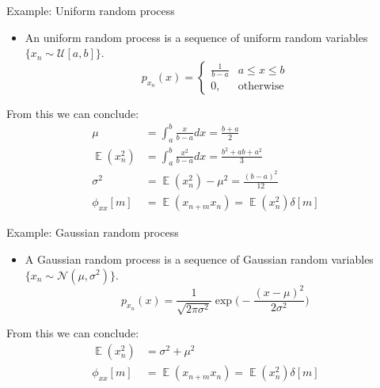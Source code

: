 \documentclass[10pt]{beamer}
\DeclareMathOperator{\E}{\mathbb{E}} %
\begin{document}
\begin{frame}{Example: Uniform random process}
	
	\begin{itemize}
		\item An uniform random process is a sequence of uniform random variables $\{x_n \sim \mathcal{U}[a, b]\}$.
		\begin{equation*}
		p_{x_n}(x) = \begin{cases}
		\displaystyle\frac{1}{b-a} & a\leq x\leq b \\
		0, &\text{otherwise}
		\end{cases}
		\end{equation*}
	\end{itemize}
	From this we can conclude:
	\begin{align*} 
	\mu &= \int_{a}^{b} \frac{x}{b-a}dx = \frac{b+a}{2} \\
	\E(x_n^2) &= \int_{a}^{b} \frac{x^2}{b-a}dx = \frac{b^2+ab+a^2}{3} \\
	\sigma^2 &= \E(x_n^2) - \mu^2 = \frac{(b-a)^2}{12} \\
	\phi_{xx}[m] &=\E(x_{n+m}x_n) = \E(x_n^2)\delta[m] \tag{Assuming IID}
	\end{align*}
\end{frame}

\begin{frame}{Example: Gaussian random process}
	
	\begin{itemize}
		\item A Gaussian random process is a sequence of Gaussian random variables $\{x_n \sim \mathcal{N}(\mu, \sigma^2)\}$.
		\begin{equation*}
		p_{x_n}(x) = \frac{1}{\sqrt{2\pi\sigma^2}}\exp\bigg(-\frac{(x-\mu)^2}{2\sigma^2}\bigg)
		\end{equation*}

	\end{itemize}
	From this we can conclude:
	\begin{align*} 
	\E(x_n^2) &= \sigma^2 + \mu^2 \\
	\phi_{xx}[m] &=\E(x_{n+m}x_n) = \E(x_n^2)\delta[m] \tag{Assuming IID}
	\end{align*}	
\end{frame}

\end{document}
